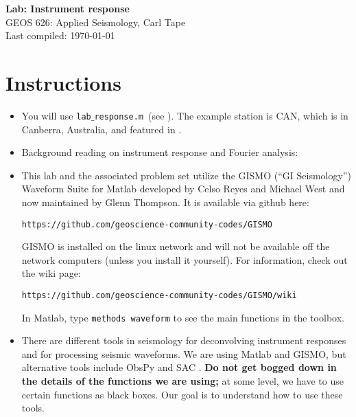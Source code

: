 \documentclass[11pt,titlepage,fleqn]{article}
\newcommand{\tfile}{{\tt lab$\_$response.m}}
\begin{document}

\begin{spacing}{1.2}
\centering
{\large \bf Lab: Instrument response} \\
GEOS 626: Applied Seismology, Carl Tape \\
Last compiled: \today
\end{spacing}


\section{Instructions}

\begin{itemize}

\item You will use \tfile\ (see ). The example station is CAN, which is in Canberra, Australia, and featured in \citet[][Figure~1]{Park2005}.


\item Background reading on instrument response and Fourier analysis: \\ \citet[][Ch.~6]{SteinWysession}


\item This lab and the associated problem set utilize the GISMO (``GI Seismology'') Waveform Suite for Matlab developed by Celso Reyes and Michael West \citep{ReyesWest2011} and now maintained by Glenn Thompson. It is available via github here:

\verb+https://github.com/geoscience-community-codes/GISMO+

GISMO is installed on the linux network and will not be available off the network computers (unless you install it yourself). For information, check out the wiki page:

\verb+https://github.com/geoscience-community-codes/GISMO/wiki+

In Matlab, type \verb+methods waveform+ to see the main functions in the toolbox.


\item There are different tools in seismology for deconvolving instrument responses and for processing seismic waveforms. We are using Matlab and GISMO, but alternative tools include ObsPy \citep{obspy2010} and SAC \citep{SAC}. {\bf Do not get bogged down in the details of the functions we are using;} at some level, we have to use certain functions as black boxes. Our goal is to understand how to use these tools.


\end{itemize}
\end{document}
